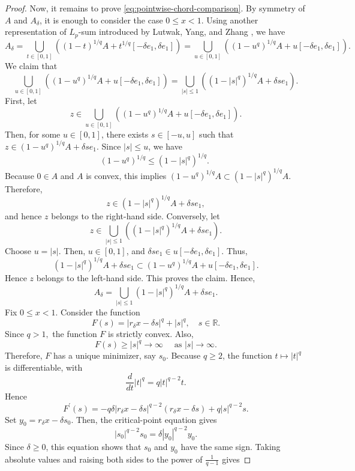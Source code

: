 \documentclass[11pt,a4paper]{amsart}
\theoremstyle{plain}
\theoremstyle{definition}
\begin{document}
\begin{proof}
Now, it remains to prove \eqref{eq:pointwise-chord-comparison}. By symmetry of $A$ and $A_\delta$, it is enough to consider the case $0\leq x < 1$. 
Using  another representation of $L_p$-sum introduced by Lutwak, Yang, and Zhang \cite{LYZ-12}, we have
\[
    A_\delta =  \bigcup_{t \in [0,1]} \left( (1-t)^{1/q} A + t^{1/q}[-\delta e_1,\delta e_1] \right) 
    = 
    \bigcup_{u \in [0,1]} \left( (1-u^q)^{1/q} A + u[-\delta e_1,\delta e_1] \right)  
    .
\]
We claim that
\[
    \bigcup_{u \in [0,1]} \left( (1-u^q)^{1/q} A + u[-\delta e_1,\delta e_1] \right)  
    = 
    \bigcup_{|s|\leq1}
    \left( (1-|s|^q)^{1/q}A+\delta s e_1 \right).
\]
First, let
$$
z \in \bigcup_{u \in[0,1]}\left(\left(1-u^q\right)^{1 / q} A+u\left[-\delta e_1, \delta e_1\right]\right) .
$$
Then, for some $u \in[0,1]$, there exists $s \in[-u, u]$ such that
$
z \in\left(1-u^q\right)^{1 / q} A+\delta s e_1 .
$
Since $|s| \leq u$, we have
$$
\left(1-u^q\right)^{1 / q} \leq\left(1-|s|^q\right)^{1 / q} \text {. }
$$
Because $0 \in A$ and $A$ is convex, this implies
$
\left(1-u^q\right)^{1 / q} A \subset\left(1-|s|^q\right)^{1 / q} A .
$
Therefore,
$$
z \in\left(1-|s|^q\right)^{1 / q} A+\delta s e_1,
$$
and hence $z$ belongs to the right-hand side. Conversely, let
$$
z \in \bigcup_{|s| \leq 1}\left(\left(1-|s|^q\right)^{1 / q} A+\delta s e_1\right).
$$
Choose $u=|s|$. Then, $u \in[0,1]$, and
$
\delta s e_1 \in u\left[-\delta e_1, \delta e_1\right] .
$
Thus,
$$
\left(1-|s|^q\right)^{1 / q} A+\delta s e_1 \subset\left(1-u^q\right)^{1 / q} A+u\left[-\delta e_1, \delta e_1\right] .
$$
Hence $z$ belongs to the left-hand side. This proves the claim. Hence,
\begin{equation}
\label{eq:Lp-sum-union-horizontal}
    A_\delta
    =
    \bigcup_{|s|\leq1}
    (1-|s|^q)^{1/q}A+\delta s e_1.
\end{equation}
Fix $0\leq x<1$. Consider the function
\[
    F(s)=\left|r_\delta x-\delta s\right|^q+|s|^q, \quad s \in \mathbb{R}.
\]
Since $q>1, $ the function $ F$ is strictly convex. Also,
$$
F(s) \geq|s|^q \longrightarrow \infty \quad \text { as }|s| \rightarrow \infty .
$$
Therefore, $F$ has a unique minimizer, say $s_0$. Because $q \geq 2$, the function $t \mapsto|t|^q$ is differentiable, with
$$
\frac{d}{d t}|t|^q=q|t|^{q-2} t.
$$
Hence
$$
F^{\prime}(s)=-q \delta|r_\delta x -\delta s|^{q-2}(r_\delta x-\delta s)+q|s|^{q-2} s .
$$
Set $y_0  = r_\delta x- \delta s_0$.  Then, the critical-point equation gives
\[
    \left|s_0\right|^{q-2} s_0=\delta\left|y_0\right|^{q-2} y_0.
\]
Since $\delta \geq 0$, this equation shows that $s_0$ and $y_0$ have the same sign. Taking absolute values and raising both sides to the power of $\frac{1}{q-1}$ gives

\end{proof}
\end{document}
